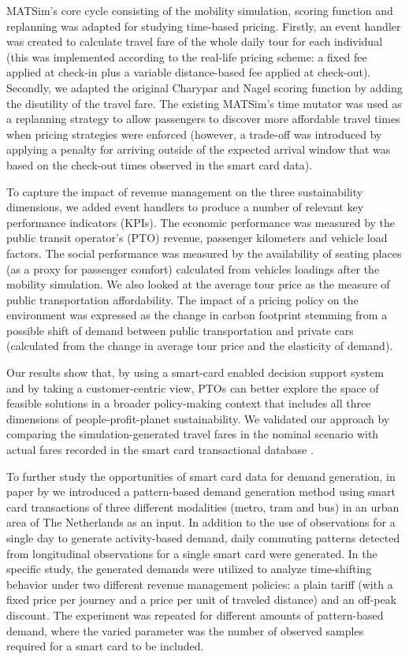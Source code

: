 MATSim's core cycle consisting of the mobility simulation, scoring function and replanning was adapted for studying time-based pricing. Firstly, an event handler was created to calculate travel fare of the whole daily tour for each individual (this was implemented according to the real-life pricing scheme: a fixed fee applied at check-in plus a variable distance-based fee applied at check-out). Secondly, we adapted the original Charypar and Nagel scoring function \citep[][]{CharyparNagel2005ga4acts} by adding the disutility of the travel fare. The existing MATSim's time mutator was used as a replanning strategy to allow passengers to discover more affordable travel times when pricing strategies were enforced (however, a trade-off was introduced by applying a penalty for arriving outside of the expected arrival window that was based on the check-out times observed in the smart card data).

To capture the impact of revenue management on the three sustainability dimensions, we added event handlers to produce a number of relevant key performance indicators (KPIs). The economic performance was measured by the public transit operator's (PTO) revenue, passenger kilometers and vehicle load factors. The social performance was measured by the availability of seating places (as a proxy for passenger comfort) calculated from vehicles loadings after the mobility simulation. We also looked at the average tour price as the measure of public transportation affordability. The impact of a pricing policy on the environment was expressed as the change in carbon footprint stemming from a possible shift of demand between public transportation and private cars (calculated from the change in average tour price and the elasticity of demand). 

Our results show that, by using a smart-card enabled decision support system and by taking a customer-centric view, PTOs can better explore the space of feasible solutions in a broader policy-making context that includes all three dimensions of people-profit-planet sustainability. We validated our approach by comparing the simulation-generated travel fares in the nominal scenario with actual fares recorded in the smart card transactional database \citep[see][]{LovricEtAl_DSS_2013}.

To further study the opportunities of smart card data for demand generation, in paper by \citet[][]{BoumanEtAl_AAMAS_2012} we introduced a pattern-based demand generation method using smart card transactions of three different modalities (metro, tram and bus) in an urban area of The Netherlands as an input. In addition to the use of observations for a single day to generate activity-based demand, daily commuting patterns detected from longitudinal observations for a single smart card were generated. In the specific study, the generated demands were utilized to analyze time-shifting behavior under two different revenue management policies: a plain tariff (with a fixed price per journey and a price per unit of traveled distance) and an off-peak discount. The experiment was repeated for different amounts of pattern-based demand, where the varied parameter was the number of observed samples required for a smart card to be included. 

